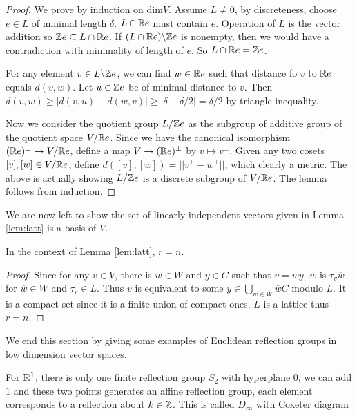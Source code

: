 \documentclass[../main.tex]{subfiles}
\begin{document}
\begin{proof}
    We prove by induction on $\text{dim}V$. Assume $L \neq 0$, by discreteness, choose $e\in L$ of minimal length $\delta$. $L\cap \mathbb{R} e$ must contain $e$. Operation of $L$ is the vector addition so $\mathbb{Z} e \subseteq L\cap \mathbb{R} e$. If $(L\cap \mathbb{R} e) \backslash \mathbb{Z} e$ is nonempty, then we would have a contradiction with minimality of length of $e$. So $L\cap \mathbb{R} e = \mathbb{Z} e$. 

    For any element $v\in L \backslash \mathbb{Z} e$, we can find $w\in \mathbb{R} e$ such that distance fo $v$ to $\mathbb{R} e$ equals $d(v,w)$. Let $u\in\mathbb{Z} e$ be of minimal distance to $v$. Then $d(v,w)\geq |d(v,u)-d(w,v)| \geq |\delta-\delta/2|=\delta/2$ by triangle inequality.

    Now we consider the quotient group $L/\mathbb{Z} e$ as the subgroup of additive group of the quotient space $V/ \mathbb{R} e$. Since we have the canonical isomorphism $(\mathbb{R} e)^{\perp} \rightarrow V/\mathbb{R} e$, define a map $V\rightarrow (\mathbb{R} e)^{\perp}$ by $v \mapsto v^{\perp}$. Given any two cosets $[v],[w]\in V/\mathbb{R} e$, define $d([v],[w])=||v^{\perp}-w^{\perp}||$, which clearly a metric. The above is actually showing $L/\mathbb{Z} e$ is a discrete subgroup of $V/\mathbb{R} e$. The lemma follows from induction.
\end{proof}

We are now left to show the set of linearly independent vectors given in Lemma \ref{lem:latt} is a basis of $V$.

\begin{lemma}
    In the context of Lemma \ref{lem:latt}, $r=n$.
\end{lemma}

\begin{proof}
    Since for any $v\in V$, there is $w\in W$ and $y\in \overline C$ such that $v=wy$. $w$ is $\tau_v\overline w$ for $\overline w\in \overline W$ and $\tau_v\in L$. Thus $v$ is equivalent to some $y\in \bigcup_{\overline w\in\overline W}\overline wC$ modulo $L$. It is a compact set since it is a finite union of compact ones. $L$ is a lattice thus $r=n$.
\end{proof}

We end this section by giving some examples of Euclidean reflection groups in low dimension vector spaces.

For $\mathbb{R}^1$, there is only one finite reflection group $S_2$ with hyperplane $0$, we can add $1$ and these two points generates an affine reflection group, each element corresponds to a reflection about $k\in \mathbb{Z}$. This is called $D_{\infty}$ with Coxeter diagram 
\end{document}
